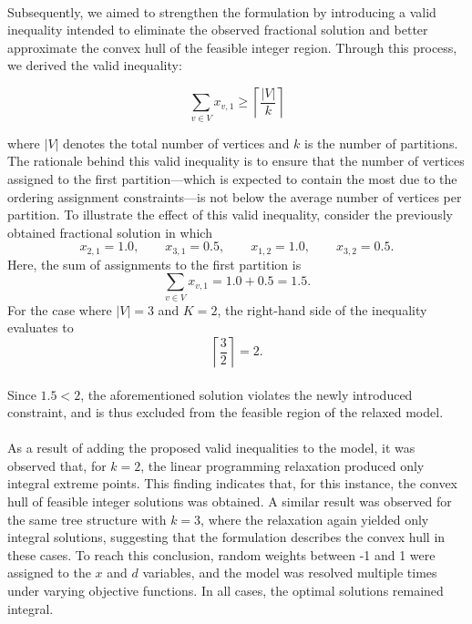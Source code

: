 \paragraph{} Subsequently, we aimed to strengthen the formulation by introducing a valid inequality intended to eliminate the observed fractional solution and better approximate the convex hull of the feasible integer region. Through this process, we derived the valid inequality:

\begin{equation}
    \sum_{v \in V} x_{v,1} \geq \left\lceil \frac{|V|}{k} \right\rceil \label{eq:valid1}
\end{equation}

where $|V|$ denotes the total number of vertices and $k$ is the number of partitions. The rationale behind this valid inequality is to ensure that the number of vertices assigned to the first partition—which is expected to contain the most due to the ordering assignment constraints—is not below the average number of vertices per partition. To illustrate the effect of this valid inequality, consider the previously obtained fractional solution in which
\[
x_{2,1} = 1.0, \qquad x_{3,1} = 0.5, \qquad x_{1,2} = 1.0, \qquad x_{3,2} = 0.5.
\]
Here, the sum of assignments to the first partition is
\[
\sum_{v \in V} x_{v,1} = 1.0 + 0.5 = 1.5.
\]
For the case where $|V| = 3$ and $K = 2$, the right-hand side of the inequality evaluates to
\[
\left\lceil \frac{3}{2} \right\rceil = 2.
\]

\paragraph{} Since $1.5 < 2$, the aforementioned solution violates the newly introduced constraint, and is thus excluded from the feasible region of the relaxed model.

\paragraph{} As a result of adding the proposed valid inequalities to the model, it was observed that, for $k=2$, the linear programming relaxation produced only integral extreme points. This finding indicates that, for this instance, the convex hull of feasible integer solutions was obtained. A similar result was observed for the same tree structure with $k=3$, where the relaxation again yielded only integral solutions, suggesting that the formulation describes the convex hull in these cases. To reach this conclusion, random weights between -1 and 1 were assigned to the $x$ and $d$ variables, and the model was resolved multiple times under varying objective functions. In all cases, the optimal solutions remained integral.

